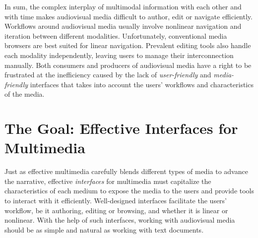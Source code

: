 In sum, the complex interplay of multimodal information with each other and with time makes audiovisual media difficult to author, edit or navigate efficiently. Workflows around audiovisual media usually involve nonlinear navigation and iteration between different modalities. Unfortunately, conventional media browsers are best suited for linear navigation. Prevalent editing tools also handle each modality independently, leaving users to manage their interconnection manually. Both consumers and producers of audiovisual media have a right to be frustrated at the inefficiency caused by the lack of \emph{user-friendly} and \emph{media-friendly} interfaces that takes into account the users' workflows and characteristics of the media.\\ 
%
\section{The Goal: Effective Interfaces for Multimedia}
Just as effective multimedia carefully blends different types of media to advance the narrative, effective \textit{interfaces} for multimedia must capitalize the characteristics of each medium to expose the media to the users and provide tools to interact with it efficiently. Well-designed interfaces facilitate the users' workflow, be it authoring, editing or browsing, and whether it is linear or nonlinear. With the help of such interfaces, working with audiovisual media should be as simple and natural as working with text documents.\\

